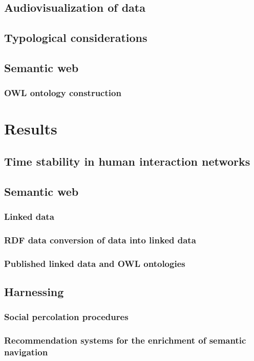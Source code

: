 \documentclass[a4paper,openright,12pt]{report} %
\begin{document}
\section{Audiovisualization of data}
\section{Typological considerations}
\section{Semantic web}
\subsection{OWL ontology construction}

\chapter{Results}
\section{Time stability in human interaction networks}
\section{Semantic web}
\subsection{Linked data}
\subsection{RDF data conversion of data into linked data}
\subsection{Published linked data and OWL ontologies}
\section{Harnessing}
\subsection{Social percolation procedures}
\subsection{Recommendation systems for the enrichment of semantic navigation}
\end{document}
